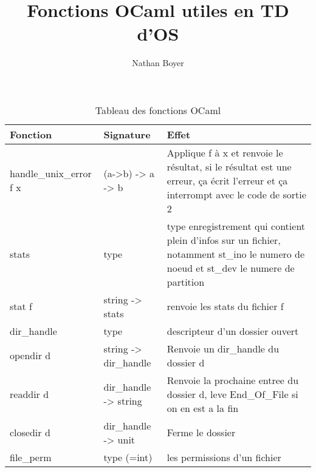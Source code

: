 \documentclass{article}
\title{Fonctions OCaml utiles en TD d'OS}
\author{Nathan Boyer}
\begin{document}
\maketitle

\begin{table}[htbp]
    \centering
    \begin{tabular}{|p{4cm}|p{3cm}|p{7cm}|} %
        \hline
        Fonction & Signature & Effet \\ 
        \hline 
        handle\_unix\_error f x & (a->b) -> a -> b & Applique f à x et renvoie le résultat, si le résultat est une erreur, ça écrit l'erreur et ça interrompt avec le code de sortie 2 \\ 
        \hline 
        stats & type & type enregistrement qui contient plein d'infos sur un fichier, notamment st\_ino le numero de noeud et st\_dev le numere de partition \\ 
        \hline 
        stat f & string -> stats & renvoie les stats du fichier f \\ 
        \hline 
        dir\_handle & type & descripteur d'un dossier ouvert \\ 
        \hline 
        opendir d & string -> dir\_handle & Renvoie un dir\_handle du dossier d \\ 
        \hline 
        readdir d & dir\_handle -> string & Renvoie la prochaine entree du dossier d, leve End\_Of\_File si on en est a la fin \\ 
        \hline 
        closedir d & dir\_handle -> unit & Ferme le dossier \\ 
        \hline 
        file\_perm & type (=int) & les permissions d'un fichier \\ 
        \hline 
    \end{tabular}
    \caption{Tableau des fonctions OCaml}
    \label{tab:tableau1} 
\end{table}
\end{document}
